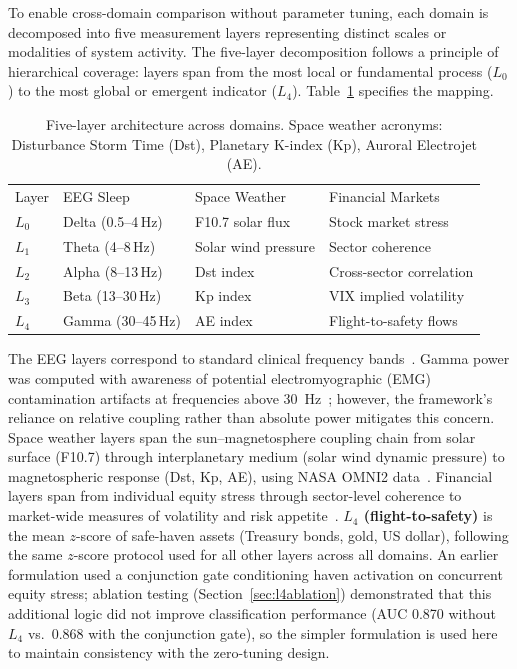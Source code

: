 \documentclass[aip,cha,reprint,amsmath,amssymb,final,floatfix]{revtex4-2}
\begin{document}
To enable cross-domain comparison without parameter tuning, each domain is decomposed into five measurement layers representing distinct scales or modalities of system activity. The five-layer decomposition follows a principle of hierarchical coverage: layers span from the most local or fundamental process ($L_0$) to the most global or emergent indicator ($L_4$). Table~\ref{tab:layers} specifies the mapping.

\begin{table}[!htbp]
\caption[Five-layer architecture mapping for EEG, space weather, and financial domains]{\label{tab:layers}Five-layer architecture across domains. Space weather acronyms: Disturbance Storm Time (Dst), Planetary K-index (Kp), Auroral Electrojet (AE).}
\begin{ruledtabular}
\begin{tabular}{lp{2.0cm}p{2.0cm}p{2.1cm}}
Layer & EEG Sleep & Space Weather & Financial Markets \\
$L_0$ & Delta (0.5--4\,Hz) & F10.7 solar flux & Stock market stress \\
$L_1$ & Theta (4--8\,Hz) & Solar wind pressure & Sector coherence \\
$L_2$ & Alpha (8--13\,Hz) & Dst index & Cross-sector correlation \\
$L_3$ & Beta (13--30\,Hz) & Kp index & VIX implied volatility \\
$L_4$ & Gamma (30--45\,Hz) & AE index & Flight-to-safety flows \\
\end{tabular}
\end{ruledtabular}
\end{table}

The EEG layers correspond to standard clinical frequency bands~\cite{berry2017,oppenheim1997}. Gamma power was computed with awareness of potential electromyographic (EMG) contamination artifacts at frequencies above 30~Hz~\cite{muthukumaraswamy2013}; however, the framework's reliance on relative coupling rather than absolute power mitigates this concern. Space weather layers span the sun--magnetosphere coupling chain from solar surface (F10.7) through interplanetary medium (solar wind dynamic pressure) to magnetospheric response (Dst, Kp, AE), using NASA OMNI2 data~\cite{papitashvili2020}. Financial layers span from individual equity stress through sector-level coherence to market-wide measures of volatility and risk appetite~\cite{forbes2002}. \textbf{$L_4$ (flight-to-safety)} is the mean $z$-score of safe-haven assets (Treasury bonds, gold, US dollar), following the same $z$-score protocol used for all other layers across all domains. An earlier formulation used a conjunction gate conditioning haven activation on concurrent equity stress; ablation testing (Section~\ref{sec:l4ablation}) demonstrated that this additional logic did not improve classification performance (AUC 0.870 without $L_4$ vs.\ 0.868 with the conjunction gate), so the simpler formulation is used here to maintain consistency with the zero-tuning design.
\end{document}
